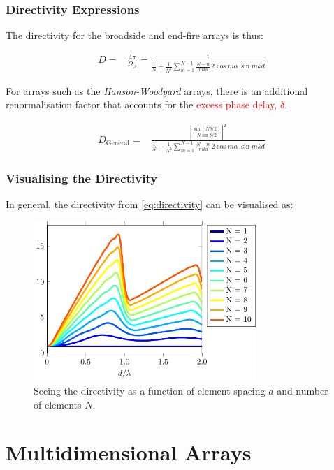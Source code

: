 \documentclass[10pt]{beamer}
\begin{document}
\begin{frame}
    \frametitle{Directivity Expressions}
The directivity for the broadside and end-fire arrays is thus:

\begin{align*}
    D {}=& \frac{4\pi }{\Omega_A} = \frac{1}{\frac{1}{N}+\frac{1}{N^{2}} \sum_{m=1}^{N-1} \frac{N-m}{m k d} 2 \cos m \alpha \, \sin m k d}
\end{align*}

For arrays such as the \textit{Hanson-Woodyard} arrays, there is an additional renormalisation factor that accounts for the \textcolor{red}{excess phase delay, $\delta$},

\begin{align}
    D_{\text{General}} {}=&  \frac{\left|\frac{\sin (N \delta/2 )}{N \sin \delta/2 }\right|^2}{\frac{1}{N}+\frac{1}{N^{2}} \sum_{m=1}^{N-1} \frac{N-m}{m k d} 2 \cos m \alpha \, \sin m k d}
    \label{eq:directivity}
\end{align}
\end{frame}

\begin{frame}
    \frametitle{Visualising the Directivity}
In general, the directivity from \eqref{eq:directivity} can be visualised as:
\begin{figure}[h!]
    \centering
    \includegraphics[width=0.75\textwidth]{directivity.pdf}
    \caption{Seeing the directivity as a function of element spacing $d$ and number of elements $N$.}
    \label{fig:directivity}
\end{figure} 
\end{frame}

\section{Multidimensional Arrays}
\end{document}
